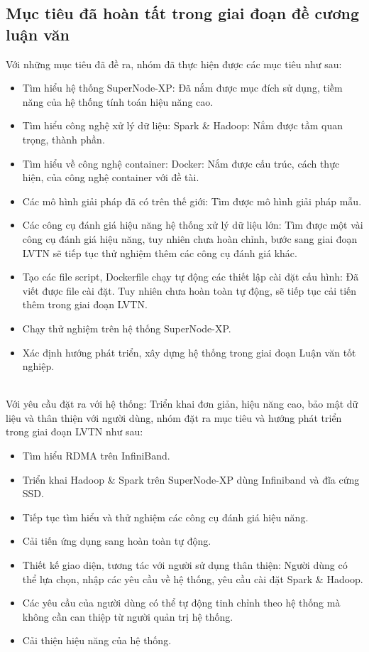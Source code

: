 \documentclass[11pt,a4paper]{article}
\begin{document}
\subsection{Mục tiêu đã hoàn tất trong giai đoạn đề cương luận văn}
Với những mục tiêu đã đề ra, nhóm đã thực hiện được các mục tiêu như sau:\\
\begin{itemize}
    \item Tìm hiểu hệ thống SuperNode-XP: Đã nắm được mục đích sử dụng, tiềm năng của hệ thống tính toán hiệu năng cao.
    \item Tìm hiểu công nghệ xử lý dữ liệu: Spark \& Hadoop: Nắm được tầm quan trọng, thành phần.
    \item Tìm hiểu về công nghệ container: Docker: Nắm được cấu trúc, cách thực hiện, của công nghệ container với đề tài.
    \item Các mô hình giải pháp đã có trên thế giới: Tìm được mô hình giải pháp mẫu.
    \item Các công cụ đánh giá hiệu năng hệ thống xử lý dữ liệu lớn: Tìm được một vài công cụ đánh giá hiệu năng, tuy nhiên chưa hoàn chỉnh, bước sang giai đoạn LVTN sẽ tiếp tục thử nghiệm thêm các công cụ đánh giá khác.
    \item Tạo các file script, Dockerfile chạy tự động các thiết lập cài đặt cấu hình: Đã viết được file cài đặt. Tuy nhiên chưa hoàn toàn tự động, sẽ tiếp tục cải tiến thêm trong giai đoạn LVTN.
    \item Chạy thử nghiệm trên hệ thống SuperNode-XP.
    \item Xác định hướng phát triển, xây dựng hệ thống trong giai đoạn Luận văn tốt nghiệp.
\end{itemize}
\\
Với yêu cầu đặt ra với hệ thống: Triển khai đơn giản, hiệu năng cao, bảo mật dữ liệu và thân thiện với người dùng, nhóm đặt ra mục tiêu và hướng phát triển trong giai đoạn LVTN như sau: \\
\begin{itemize}
    \item Tìm hiểu RDMA trên InfiniBand.
    \item Triển khai Hadoop \& Spark trên SuperNode-XP dùng Infiniband và đĩa cứng SSD.
    \item Tiếp tục tìm hiểu và thử nghiệm các công cụ đánh giá hiệu năng.
    \item Cải tiến ứng dụng sang hoàn toàn tự động.
    \item Thiết kế giao diện, tương tác với người sử dụng thân thiện: Người dùng có thể lựa chọn, nhập các yêu cầu về hệ thống, yêu cầu cài đặt Spark \& Hadoop.
    \item Các yêu cầu của người dùng có thể tự động tinh chỉnh theo hệ thống mà không cần can thiệp từ người quản trị hệ thống.
    \item Cải thiện hiệu năng của hệ thống.
\end{itemize}
\end{document}
